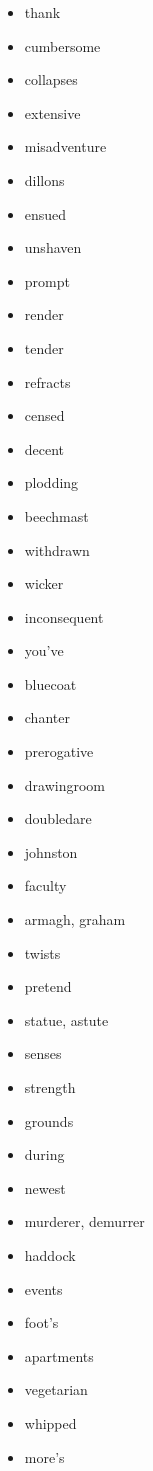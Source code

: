 \documentclass{article}
\begin{document}
\begin{itemize}
    \item thank
    \item cumbersome
    \item collapses
    \item extensive
    \item misadventure
    \item dillons
    \item ensued
    \item unshaven
    \item prompt
    \item render
    \item tender
    \item refracts
    \item censed
    \item decent
    \item plodding
    \item beechmast
    \item withdrawn
    \item wicker
    \item inconsequent
    \item you've
    \item bluecoat
    \item chanter
    \item prerogative
    \item drawingroom
    \item doubledare
    \item johnston
    \item faculty
    \item armagh, graham
    \item twists
    \item pretend
    \item statue, astute
    \item senses
    \item strength
    \item grounds
    \item during
    \item newest
    \item murderer, demurrer
    \item haddock
    \item events
    \item foot's
    \item apartments
    \item vegetarian
    \item whipped
    \item more's

\end{itemize}
\end{document}
